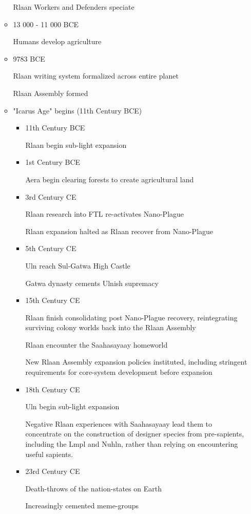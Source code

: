 \begin{itemize}
\begin{itemize}
Rlaan Workers and Defenders speciate 
\item	 13 000 - 11 000 BCE 

Humans develop agriculture 
\item	9783 BCE 

Rlaan writing system formalized across entire planet 

Rlaan Assembly formed 

\item "Icarus Age" begins (11th Century BCE)
\begin{itemize}
\item	11th Century BCE 

Rlaan begin sub-light expansion 
\item	1st Century BCE 

Aera begin clearing forests to create agricultural land 
\item	3rd Century CE 

Rlaan research into FTL re-activates Nano-Plague 

Rlaan expansion halted as Rlaan recover from Nano-Plague 

\item	5th Century CE 

Uln reach Sul-Gatwa High Castle 

Gatwa dynasty cements Ulnish supremacy 

\item	15th Century CE 

Rlaan finish consolidating post Nano-Plague recovery, reintegrating
surviving colony worlds back into the Rlaan Assembly

Rlaan encounter the Saahasayaay homeworld 

New Rlaan Assembly expansion policies instituted, including stringent requirements for core-system development before expansion 

\item	18th Century CE 

Uln begin sub-light expansion 

Negative Rlaan experiences with Saahasayaay lead them to concentrate
on the construction of designer species from pre-sapients, including
the Lmpl and Nuhln, rather than relying on encountering useful
sapients.

\item	23rd Century CE 

Death-throws of the nation-states on Earth 

Increasingly cemented meme-groups 


\end{itemize}
\end{itemize}
\end{itemize}
